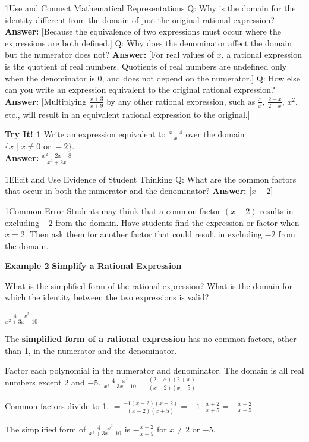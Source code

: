 \documentclass{article}
\newenvironment{example}[1]{\textbf{Example #1}}{}
\newenvironment{tryit}[1]{\textbf{Try It! #1}}{}
\newenvironment{te-addendum}[2]{\textbf{TE (#1 - #2)}}{}
\newcommand{\answer}[1]{\textbf{Answer:} #1}
\begin{document}
\begin{te-addendum}{1}{Use and Connect Mathematical Representations}
Q: Why is the domain for the identity different from the domain of just the original rational expression?
\answer{[Because the equivalence of two expressions must occur where the expressions are both defined.]}
Q: Why does the denominator affect the domain but the numerator does not?
\answer{[For real values of $x$, a rational expression is the quotient of real numbers. Quotients of real numbers are undefined only when the denominator is 0, and does not depend on the numerator.]}
Q: How else can you write an expression equivalent to the original rational expression?
\answer{[Multiplying $\frac{x+3}{x+9}$ by any other rational expression, such as $\frac{x}{x}$, $\frac{2-x}{2-x}$, $x^2$, etc., will result in an equivalent rational expression to the original.]}
\end{te-addendum}

\begin{tryit}{1}
Write an expression equivalent to $\frac{x-4}{x}$ over the domain $\{x \mid x \neq 0 \text{ or } -2\}$. \\
\answer{$\frac{x^2 - 2x - 8}{x^2 + 2x}$}
\end{tryit}

\begin{te-addendum}{1}{Elicit and Use Evidence of Student Thinking}
Q: What are the common factors that occur in both the numerator and the denominator?
\answer{[$x+2$]}
\end{te-addendum}

\begin{te-addendum}{1}{Common Error}
Students may think that a common factor $(x - 2)$ results in excluding $-2$ from the domain. Have students find the expression or factor when $x = 2$. Then ask them for another factor that could result in excluding $-2$ from the domain.
\end{te-addendum}

\begin{example}{2}
\textbf{Simplify a Rational Expression}

What is the simplified form of the rational expression? What is the domain for which the identity between the two expressions is valid?

$\frac{4 - x^2}{x^2 + 3x - 10}$

The \textbf{simplified form of a rational expression} has no common factors, other than 1, in the numerator and the denominator.

Factor each polynomial in the numerator and denominator. The domain is all real numbers except $2$ and $-5$.
$\frac{4 - x^2}{x^2 + 3x - 10} = \frac{(2 - x)(2 + x)}{(x - 2)(x + 5)}$

Common factors divide to 1.
$= \frac{-1(x - 2)(x + 2)}{(x - 2)(x + 5)} = -1 \cdot \frac{x + 2}{x + 5} = -\frac{x + 2}{x + 5}$

The simplified form of $\frac{4 - x^2}{x^2 + 3x - 10}$ is $-\frac{x + 2}{x + 5}$ for $x \neq 2$ or $-5$.
\end{example}
\end{document}
